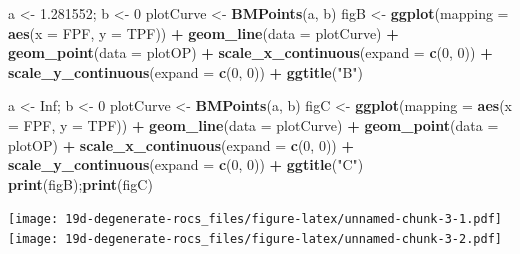\documentclass[
]{book}
\newenvironment{Shaded}{\begin{snugshade}}{\end{snugshade}}
\newcommand{\DataTypeTok}[1]{\textcolor[rgb]{0.13,0.29,0.53}{#1}}
\newcommand{\DecValTok}[1]{\textcolor[rgb]{0.00,0.00,0.81}{#1}}
\newcommand{\FloatTok}[1]{\textcolor[rgb]{0.00,0.00,0.81}{#1}}
\newcommand{\KeywordTok}[1]{\textcolor[rgb]{0.13,0.29,0.53}{\textbf{#1}}}
\newcommand{\NormalTok}[1]{#1}
\newcommand{\OperatorTok}[1]{\textcolor[rgb]{0.81,0.36,0.00}{\textbf{#1}}}
\newcommand{\OtherTok}[1]{\textcolor[rgb]{0.56,0.35,0.01}{#1}}
\newcommand{\StringTok}[1]{\textcolor[rgb]{0.31,0.60,0.02}{#1}}
\begin{document}
\begin{Shaded}
\begin{Highlighting}[]
\NormalTok{a <-}\StringTok{ }\FloatTok{1.281552}\NormalTok{; b <-}\StringTok{ }\DecValTok{0}
\NormalTok{plotCurve <-}\StringTok{ }\KeywordTok{BMPoints}\NormalTok{(a, b)}
\NormalTok{figB <-}\StringTok{ }\KeywordTok{ggplot}\NormalTok{(}\DataTypeTok{mapping =} \KeywordTok{aes}\NormalTok{(}\DataTypeTok{x =}\NormalTok{ FPF, }\DataTypeTok{y =}\NormalTok{ TPF)) }\OperatorTok{+}\StringTok{ }
\StringTok{  }\KeywordTok{geom_line}\NormalTok{(}\DataTypeTok{data =}\NormalTok{ plotCurve) }\OperatorTok{+}\StringTok{ }
\StringTok{  }\KeywordTok{geom_point}\NormalTok{(}\DataTypeTok{data =}\NormalTok{ plotOP)  }\OperatorTok{+}\StringTok{ }
\StringTok{  }\KeywordTok{scale_x_continuous}\NormalTok{(}\DataTypeTok{expand =} \KeywordTok{c}\NormalTok{(}\DecValTok{0}\NormalTok{, }\DecValTok{0}\NormalTok{)) }\OperatorTok{+}\StringTok{ }
\StringTok{  }\KeywordTok{scale_y_continuous}\NormalTok{(}\DataTypeTok{expand =} \KeywordTok{c}\NormalTok{(}\DecValTok{0}\NormalTok{, }\DecValTok{0}\NormalTok{)) }\OperatorTok{+}
\StringTok{  }\KeywordTok{ggtitle}\NormalTok{(}\StringTok{"B"}\NormalTok{)}

\NormalTok{a <-}\StringTok{ }\OtherTok{Inf}\NormalTok{; b <-}\StringTok{ }\DecValTok{0}
\NormalTok{plotCurve <-}\StringTok{ }\KeywordTok{BMPoints}\NormalTok{(a, b)}
\NormalTok{figC <-}\StringTok{ }\KeywordTok{ggplot}\NormalTok{(}\DataTypeTok{mapping =} \KeywordTok{aes}\NormalTok{(}\DataTypeTok{x =}\NormalTok{ FPF, }\DataTypeTok{y =}\NormalTok{ TPF)) }\OperatorTok{+}\StringTok{ }
\StringTok{  }\KeywordTok{geom_line}\NormalTok{(}\DataTypeTok{data =}\NormalTok{ plotCurve) }\OperatorTok{+}\StringTok{ }
\StringTok{  }\KeywordTok{geom_point}\NormalTok{(}\DataTypeTok{data =}\NormalTok{ plotOP)  }\OperatorTok{+}\StringTok{ }
\StringTok{  }\KeywordTok{scale_x_continuous}\NormalTok{(}\DataTypeTok{expand =} \KeywordTok{c}\NormalTok{(}\DecValTok{0}\NormalTok{, }\DecValTok{0}\NormalTok{)) }\OperatorTok{+}\StringTok{ }
\StringTok{  }\KeywordTok{scale_y_continuous}\NormalTok{(}\DataTypeTok{expand =} \KeywordTok{c}\NormalTok{(}\DecValTok{0}\NormalTok{, }\DecValTok{0}\NormalTok{)) }\OperatorTok{+}
\StringTok{  }\KeywordTok{ggtitle}\NormalTok{(}\StringTok{"C"}\NormalTok{)}
\KeywordTok{print}\NormalTok{(figB);}\KeywordTok{print}\NormalTok{(figC)}
\end{Highlighting}
\end{Shaded}

\texttt{[image: 19d-degenerate-rocs\_files/figure-latex/unnamed-chunk-3-1.pdf]} \texttt{[image: 19d-degenerate-rocs\_files/figure-latex/unnamed-chunk-3-2.pdf]}
\end{document}
